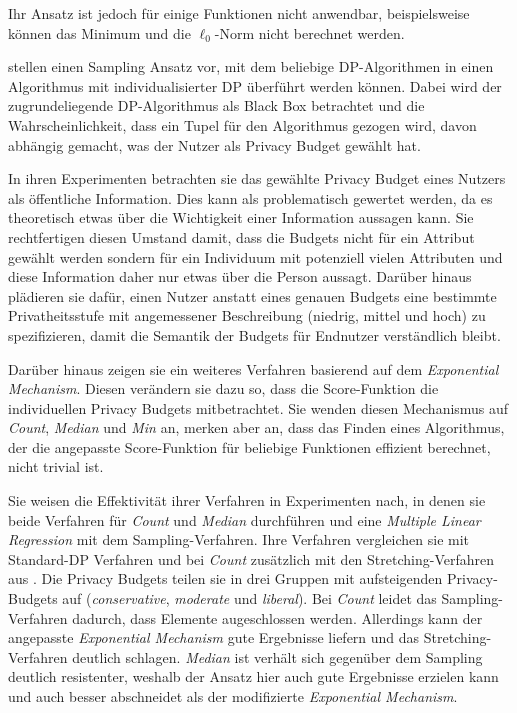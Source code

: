 Ihr Ansatz ist jedoch für einige Funktionen nicht anwendbar, beispielsweise können das Minimum und die $\ell_0$-Norm nicht berechnet werden.

\textcite{jorgensen:2015} stellen einen Sampling Ansatz vor, mit dem beliebige DP-Algorithmen in einen Algorithmus mit individualisierter DP überführt werden können. Dabei wird der zugrundeliegende DP-Algorithmus als Black Box betrachtet und die Wahrscheinlichkeit, dass ein Tupel für den Algorithmus gezogen wird, davon abhängig gemacht, was der Nutzer als Privacy Budget gewählt hat.

In ihren Experimenten betrachten sie das gewählte Privacy Budget eines Nutzers als öffentliche Information. Dies kann als problematisch gewertet werden, da es theoretisch etwas über die Wichtigkeit einer Information aussagen kann. Sie rechtfertigen diesen Umstand damit, dass die Budgets nicht für ein Attribut gewählt werden sondern für ein Individuum mit potenziell vielen Attributen und diese Information daher nur etwas über die Person aussagt. Darüber hinaus plädieren sie dafür, einen Nutzer anstatt eines genauen Budgets eine bestimmte Privatheitsstufe mit angemessener Beschreibung (niedrig, mittel und hoch) zu spezifizieren, damit die Semantik der Budgets für Endnutzer verständlich bleibt.

Darüber hinaus zeigen sie ein weiteres Verfahren basierend auf dem \textit{Exponential Mechanism}. Diesen verändern sie dazu so, dass die Score-Funktion die individuellen Privacy Budgets mitbetrachtet. Sie wenden diesen Mechanismus auf \textit{Count}, \textit{Median} und \textit{Min} an, merken aber an, dass das Finden eines Algorithmus, der die angepasste Score-Funktion für beliebige Funktionen effizient berechnet, nicht trivial ist.

Sie weisen die Effektivität ihrer Verfahren in Experimenten nach, in denen sie beide Verfahren für \textit{Count} und \textit{Median} durchführen und eine \textit{Multiple Linear Regression} mit dem Sampling-Verfahren. Ihre Verfahren vergleichen sie mit Standard-DP Verfahren und bei \textit{Count} zusätzlich mit den Stretching-Verfahren aus \cite{alaggan:2016}. Die Privacy Budgets teilen sie in drei Gruppen mit aufsteigenden Privacy-Budgets auf (\textit{conservative}, \textit{moderate} und \textit{liberal}). Bei \textit{Count} leidet das Sampling-Verfahren dadurch, dass Elemente augeschlossen werden. Allerdings kann der angepasste \textit{Exponential Mechanism} gute Ergebnisse liefern und das Stretching-Verfahren deutlich schlagen. \textit{Median} ist verhält sich gegenüber dem Sampling deutlich resistenter, weshalb der Ansatz hier auch gute Ergebnisse erzielen kann und auch besser abschneidet als der modifizierte \textit{Exponential Mechanism}. 

